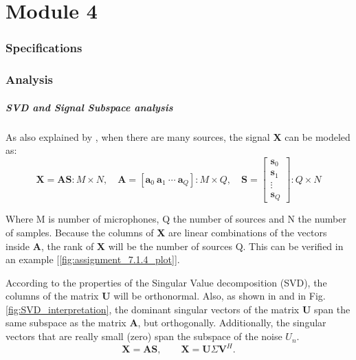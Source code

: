 \chapter{Module 4}


\subsection{Specifications}

\subsection{Analysis}
\paragraph{SVD and Signal Subspace analysis}
As also explained by \cite{IP3Man}, when there are many sources, the signal \textbf{X} can be modeled as:
\begin{equation}
\mathbf{X} = \mathbf{A}\mathbf{S} : M \times N, \quad
\mathbf{A} = [\mathbf{a}_0 \ \mathbf{a}_1 \ \cdots \ \mathbf{a}_Q] : M \times Q, \quad
\mathbf{S} = \begin{bmatrix} 
\mathbf{s}_0 \\ 
\mathbf{s}_1 \\ 
\vdots \\ 
\mathbf{s}_Q 
\end{bmatrix} : Q \times N
\end{equation}

Where M is number of microphones, Q the number of sources and N the number of samples.
Because the columns of \textbf{X} are linear combinations of the vectors inside \textbf{A}, the rank of \textbf{X} will be the number of sources Q. This can be verified in an example [\ref{fig:assignment_7.1.4_plot}].

According to the properties of the Singular Value decomposition (SVD), the columns of the matrix \textbf{U} will be orthonormal. Also, as shown in \cite{IP3Man} and in Fig. \ref{fig:SVD_interpretation}, the dominant singular vectors of the matrix \textbf{U} span the same subspace as the matrix \textbf{A}, but orthogonally. Additionally, the singular vectors that are really small (zero) span the subspace of the noise \textbf{$U_n$}.
$$
\mathbf{X} = \mathbf{A}\mathbf{S}, \qquad \mathbf{X} = \mathbf{U}\Sigma\mathbf{V}^H.
$$

